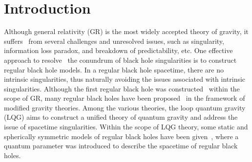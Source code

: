 \documentclass[12pt]{article}
\begin{document}
\renewcommand{\thefootnote}{\arabic{footnote}}
\newpage
\tableofcontents



\newpage
\section{Introduction}
\label{sec:intr}
Although general relativity (GR) is the most widely accepted theory of gravity,  it suffers~\cite{Hawking:1974rv,penrose1969gravitational} from several challenges and unresolved issues, such as singularity, information loss paradox, and breakdown of predictability, etc.
One effective approach to resolve~\cite{Lan:2023cvz} the conundrum of black hole singularities is to construct regular black hole models.
In a regular black hole spacetime,  there are no intrinsic singularities, thus naturally avoiding the issues associated with intrinsic singularities. 
Although the first regular black hole was constructed~\cite{bardeen1968non} within the scope of GR, many regular black holes have been proposed~\cite{Bonanno:2000ep,Koch:2014cqa,Bouhmadi-Lopez:2020wve} in the framework of modified gravity theories.
Among the various theories, the loop quantum gravity (LQG) aims to construct a unified theory of quantum gravity and address the issue of spacetime singularities. 
Within the scope of LQG theory, some static and spherically symmetric models of regular black holes have been given~\cite{Modesto:2005zm,Gambini:2013ooa,Bodendorfer:2019nvy,Bodendorfer:2019jay}, where a quantum parameter was introduced to describe the spacetime of regular black holes.%
\end{document}
